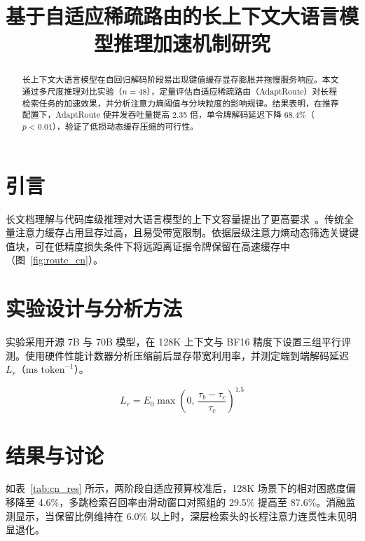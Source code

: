 \documentclass[UTF8]{ctexart}
\title{基于自适应稀疏路由的长上下文大语言模型推理加速机制研究}
\begin{document}
\maketitle

\begin{abstract}
长上下文大语言模型在自回归解码阶段易出现键值缓存显存膨胀并拖慢服务响应。本文通过多尺度推理对比实验（$n = 48$），定量评估自适应稀疏路由（AdaptRoute）对长程检索任务的加速效果，并分析注意力熵阈值与分块粒度的影响规律。结果表明，在推荐配置下，AdaptRoute 使并发吞吐量提高 2.35 倍，单令牌解码延迟下降 68.4\%（$p < 0.01$），验证了低损动态缓存压缩的可行性。
\end{abstract}

\section{引言}
长文档理解与代码库级推理对大语言模型的上下文容量提出了更高要求~\cite{dao2022neurips,vaswani2017neurips}。传统全量注意力缓存占用显存过高，且易受带宽限制。依据层级注意力熵动态筛选关键键值块，可在低精度损失条件下将远距离证据令牌保留在高速缓存中（图~\ref{fig:route_cn}）。

\section{实验设计与分析方法}
实验采用开源 7B 与 70B 模型，在 128K 上下文与 BF16 精度下设置三组平行评测。使用硬件性能计数器分析压缩前后显存带宽利用率，并测定端到端解码延迟 $L_r$（$\text{ms token}^{-1}$）。

\begin{equation}
L_r = E_0 \max\!\left(0,\, \frac{\tau_b - \tau_c}{\tau_c}\right)^{1.5}
\end{equation}

\section{结果与讨论}
如表~\ref{tab:cn_res} 所示，两阶段自适应预算校准后，128K 场景下的相对困惑度偏移降至 4.6\%，多跳检索召回率由滑动窗口对照组的 29.5\% 提高至 87.6\%。消融监测显示，当保留比例维持在 6.0\% 以上时，深层检索头的长程注意力连贯性未见明显退化。
\end{document}
